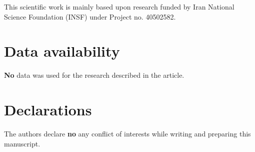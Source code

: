 \documentclass[12pt]{amsart}
\theoremstyle{definition}
\begin{document}
\medskip
\medskip

 This scientific work is mainly based upon research funded by Iran National Science Foundation (INSF) under Project no. 40502582.

\medskip


\medskip

\section*{Data availability}

\textbf{No} data was used for the research described in the article.

\medskip

\section*{Declarations}

The authors declare \textbf{no} any conflict of interests while writing and preparing this manuscript.

\bigskip
\bigskip
\bigskip
\end{document}
